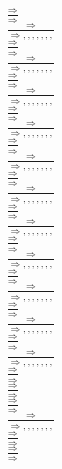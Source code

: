 \documentclass[11pt]{article}
\begin{document}
\begin{center}
\bigskip
\\$\frac{\Rightarrow }{\Rightarrow }$
\bigskip
\\$\frac{\Rightarrow }{\Rightarrow , , , , , , , }$
\bigskip
\\$\frac{\Rightarrow }{\Rightarrow }$
\bigskip
\\$\frac{\Rightarrow }{\Rightarrow , , , , , , , }$
\bigskip
\\$\frac{\Rightarrow }{\Rightarrow }$
\bigskip
\\$\frac{\Rightarrow }{\Rightarrow , , , , , , , }$
\bigskip
\\$\frac{\Rightarrow }{\Rightarrow }$
\bigskip
\\$\frac{\Rightarrow }{\Rightarrow , , , , , , , }$
\bigskip
\\$\frac{\Rightarrow }{\Rightarrow }$
\bigskip
\\$\frac{\Rightarrow }{\Rightarrow , , , , , , , }$
\bigskip
\\$\frac{\Rightarrow }{\Rightarrow }$
\bigskip
\\$\frac{\Rightarrow }{\Rightarrow , , , , , , , }$
\bigskip
\\$\frac{\Rightarrow }{\Rightarrow }$
\bigskip
\\$\frac{\Rightarrow }{\Rightarrow , , , , , , , }$
\bigskip
\\$\frac{\Rightarrow }{\Rightarrow }$
\bigskip
\\$\frac{\Rightarrow }{\Rightarrow , , , , , , , }$
\bigskip
\\$\frac{\Rightarrow }{\Rightarrow }$
\bigskip
\\$\frac{\Rightarrow }{\Rightarrow , , , , , , , }$
\bigskip
\\$\frac{\Rightarrow }{\Rightarrow }$
\bigskip
\\$\frac{\Rightarrow }{\Rightarrow , , , , , , , }$
\bigskip
\\$\frac{\Rightarrow }{\Rightarrow }$
\bigskip
\\$\frac{\Rightarrow }{\Rightarrow , , , , , , , }$
\bigskip
\\$\frac{\Rightarrow }{\Rightarrow }$
\bigskip
\\$\frac{\Rightarrow }{\Rightarrow }$
\bigskip
\\$\frac{\Rightarrow }{\Rightarrow }$
\bigskip
\\$\frac{\Rightarrow }{\Rightarrow , , , , , , , }$
\bigskip
\\$\frac{\Rightarrow }{\Rightarrow }$
\bigskip
\\$\frac{\Rightarrow }{\Rightarrow }$

\end{center}
\end{document}
